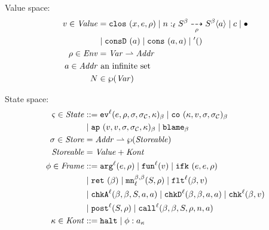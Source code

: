 \documentclass[preprint,onecolumn,9pt]{sigplanconf} %
\begin{document}
Value space:
\begin{align*}
  \mval \in \Value &=
    \clos{\mvar, \mexp, \menv}
   \alt \blclos{\mname}{\mmlab}{\mmlab}{\mlab}{\mscon}{\mscon}{\menv}{\maddr}
   \alt \mconstant
   \alt \blackhole \\
&  \alt \vconsf{\maddr}
   \alt \vcons{\maddr}{\maddr}
   \alt \sunit \\
  \menv \in \Env &= \Var \parto \Addr \\
  \maddr \in \Addr &\text{ an infinite set} \\
  \mnames &\in \wp(\Var) \\
\end{align*}

State space:
\begin{align*}
  \mstate \in \State &::=
      \ev[^\mlab]{\mexp, \menv, \msto, \mmsto, \mkont}{\mmlab} 
 \alt \co{\mkont, \mval, \msto, \mmsto}{\mmlab} \\
&\alt \ap{\mval, \mval, \msto, \mmsto, \mkont}{\mmlab}
 \alt \sblame{\mmlab} \\
\msto \in \Store &= \Addr \parto \wp(\Storeable) \\
\Storeable &= \Value + \Kont \\
\mframe \in \Frame &::=
      \kar[^\mlab]{\mexp,\menv}
 \alt \kfn[^\mlab]{\mval}
 \alt \kif{\mexp, \mexp, \menv} \\
&\alt \krt{\mmlab}
 \alt \kmon{\mmlab}{\mmlab}{\mlab}{\mscon, \menv}
 \alt \kflat[^\mlab]{\mmlab, \mval} \\
&\alt \kchkA[^\mlab]{\mmlab, \mmlab, \mscon, \maddr, \maddr}
 \alt \kchkD[^\mlab]{\mmlab, \mmlab, \maddr, \maddr}
 \alt \kcheck[^\mlab]{\mmlab, \mval} \\
&\alt \kpost[^\mlab]{\mscon, \menv}
 \alt \kmcall[^\mlab]{\mmlab, \mmlab, \mscon, \menv, \mname, \maddr} \\
\mkont \in \Kont &::= \kmt \alt \spush{\mframe}{\mkaddr}
\end{align*}

\end{document}
